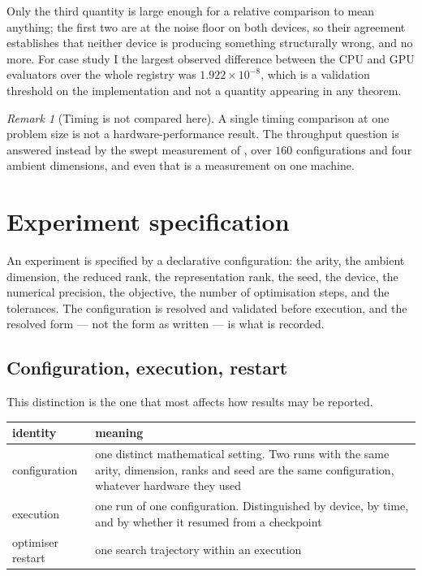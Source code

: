 \documentclass[11pt]{amsart}
\theoremstyle{remark}
\newtheorem{remark}{Remark}[section]
\begin{document}
Only the third quantity is large enough for a relative comparison to mean anything; the
first two are at the noise floor on both devices, so their agreement establishes that
neither device is producing something structurally wrong, and no more. For case study I the
largest observed difference between the CPU and GPU evaluators over the whole registry was
$1.922\times10^{-8}$, which is a validation threshold on the implementation and not a
quantity appearing in any theorem.

\begin{remark}[Timing is not compared here]
\label{rem:timing}
A single timing comparison at one problem size is not a hardware-performance result. The
throughput question is answered instead by the swept measurement of
\cite{ChaveroJassoNumerical}, over $160$ configurations and four ambient dimensions, and
even that is a measurement on one machine.
\end{remark}

\section{Experiment specification}
\label{sec:specification}

An experiment is specified by a declarative configuration: the arity, the ambient
dimension, the reduced rank, the representation rank, the seed, the device, the numerical
precision, the objective, the number of optimisation steps, and the tolerances. The
configuration is resolved and validated before execution, and the resolved form --- not the
form as written --- is what is recorded.

\subsection{Configuration, execution, restart}

This distinction is the one that most affects how results may be reported.

\begin{center}
\small
\begin{tabularx}{\linewidth}{@{}lX@{}}
\toprule
identity & meaning \\
\midrule
configuration & one distinct mathematical setting. Two runs with the same arity, dimension, ranks and seed are the same configuration, whatever hardware they used \\
execution & one run of one configuration. Distinguished by device, by time, and by whether it resumed from a checkpoint \\
optimiser restart & one search trajectory within an execution \\
\bottomrule
\end{tabularx}
\end{center}
\end{document}
